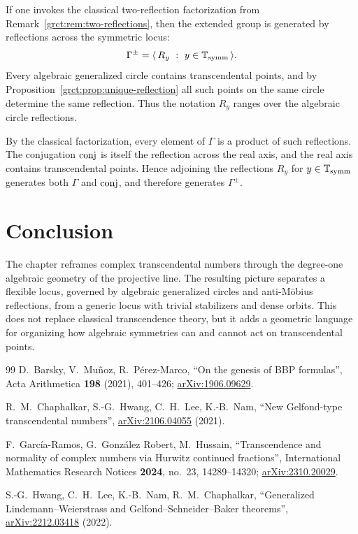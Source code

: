 \begin{remark}\label{grct:rem:gen-by-reflections}
	If one invokes the classical two-reflection factorization from Remark~\ref{grct:rem:two-reflections}, then the extended group is generated by reflections across the symmetric locus:
	\[
		\Gamma^{\pm}=\langle\, R_y\ :\ y\in\ssymm\,\rangle.
	\]
	Every algebraic generalized circle contains transcendental points, and by Proposition~\ref{grct:prop:unique-reflection} all such points on the same circle determine the same reflection. Thus the notation $R_y$ ranges over the algebraic circle reflections.
	
	By the classical factorization, every element of $\Gamma$ is a product of such reflections. The conjugation $\mathrm{conj}$ is itself the reflection across the real axis, and the real axis contains transcendental points. Hence adjoining the reflections $R_y$ for $y\in\mathbb{T}_{\mathrm{symm}}$ generates both $\Gamma$ and $\mathrm{conj}$, and therefore generates $\Gamma^{\pm}$.
	\end{remark}
	
\section{Conclusion}

The chapter reframes complex transcendental numbers through the degree-one
algebraic geometry of the projective line. The resulting picture separates a
flexible locus, governed by algebraic generalized circles and anti-Möbius
reflections, from a generic locus with trivial stabilizers and dense orbits.
This does not replace classical transcendence theory, but it adds a geometric
language for organizing how algebraic symmetries can and cannot act on
transcendental points.

	\begin{thebibliography}{99}
	D.\ Barsky, V.\ Mu\~noz, R.\ P\'erez-Marco,
	\newblock ``On the genesis of BBP formulas'',
	\newblock Acta Arithmetica \textbf{198} (2021), 401--426; \href{https://arxiv.org/abs/1906.09629}{arXiv:1906.09629}.

	R.\ M.\ Chaphalkar, S.-G.\ Hwang, C.\ H.\ Lee, K.-B.\ Nam,
	\newblock ``New Gelfond-type transcendental numbers'',
	\newblock \href{https://arxiv.org/abs/2106.04055}{arXiv:2106.04055} (2021).

	F.\ Garc\'ia-Ramos, G.\ Gonz\'alez Robert, M.\ Hussain,
	\newblock ``Transcendence and normality of complex numbers via Hurwitz continued fractions'',
	\newblock International Mathematics Research Notices \textbf{2024}, no.\ 23, 14289--14320; \href{https://arxiv.org/abs/2310.20029}{arXiv:2310.20029}.

	S.-G.\ Hwang, C.\ H.\ Lee, K.-B.\ Nam, R.\ M.\ Chaphalkar,
	\newblock ``Generalized Lindemann--Weierstrass and Gelfond--Schneider--Baker theorems'',
	\newblock \href{https://arxiv.org/abs/2212.03418}{arXiv:2212.03418} (2022).
\end{thebibliography}

\endgroup
